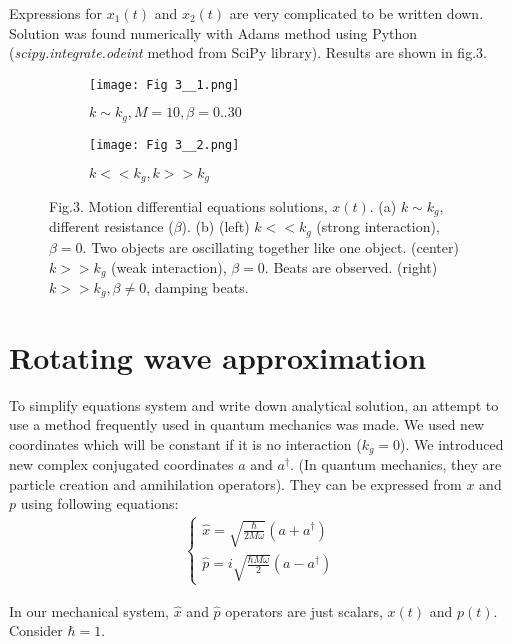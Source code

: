 \documentclass[]{article}
\begin{document}
Expressions for $x_1(t)$ and $x_2(t)$ are very complicated to be written down. Solution was found numerically with Adams method using Python (\textit{scipy.integrate.odeint} method from SciPy library). Results are shown in fig.3.
\begin{figure}
	\centering
	\begin{subfigure}{0.5\textheight}
		\texttt{[image: Fig 3\_\_1.png]}
		\caption{$k \sim k_g, M=10, \beta = 0..30$}
	\end{subfigure}
	\begin{subfigure}{0.5\textheight}
		\texttt{[image: Fig 3\_\_2.png]}
		\caption{$k<<k_g, k>>k_g$}
	\end{subfigure}
	\caption{\centering Fig.3. Motion differential equations solutions, $x(t)$. (a) $k \sim k_g$, different resistance ($\beta$). (b) (left) $k<<k_g$ (strong interaction), $\beta=0$. Two objects are oscillating together like one object. (center) $k>>k_g$ (weak interaction), $\beta=0$. Beats are observed. (right) $k>>k_g, \beta \ne 0$, damping beats.}
\end{figure}
\section{Rotating wave approximation}

To simplify equations system and write down analytical solution, an attempt to use a method frequently used in quantum mechanics was made. We used new coordinates which will be constant if it is no interaction ($k_g=0$).
\newline We introduced new complex conjugated coordinates $a$ and $a^\dag$. (In quantum mechanics, they are particle creation and annihilation operators). They can be expressed from $x$ and $p$ using following equations:
\begin{align*}
	\begin{cases}
		\hat{x} = \sqrt{\frac{\hbar}{2M\omega}}\left(a+a^\dag\right)
		\\
		\hat{p} = i\sqrt{\frac{\hbar M \omega}{2}}\left(a-a^\dag\right)
	\end{cases}	
\end{align*}

In our mechanical system, $\hat{x}$ and $\hat{p}$  operators are just scalars, $x(t)$ and $p(t)$. Consider $\hbar=1$.\newline
\end{document}
